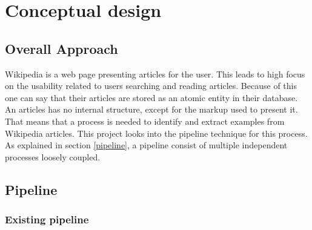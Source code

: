 
\chapter{Conceptual design}

\section{Overall Approach}

Wikipedia is a web page presenting articles for the user. This leads to high focus on the usability related to users searching and reading articles. Because of this one can say that their articles are stored as an atomic entity in their database. An articles has no internal structure, except for the markup used to present it. That means that a process is needed to identify and extract examples from Wikipedia articles. This 
project%
looks into the pipeline technique for this process. As explained in section \ref{pipeline}, a pipeline consist of multiple independent processes loosely coupled.\\



\section{Pipeline}


\subsection{Existing pipeline} \label{smila}



